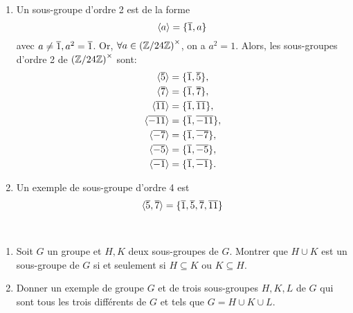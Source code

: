 {\begin{td-sol}[]
\begin{enumerate}
            \item Un sous-groupe d'ordre 2 est de la forme
            \begin{equation*}
                \langle a\rangle = \{\overline{1}, a\}
            \end{equation*}
            avec \(a\ne\overline{1}, a^2 = \overline{1}\). Or, \(\forall a\in{(\mathbb{Z}/24\mathbb{Z})}^\times\),
            on a \(a^2=1\). Alors, les sous-groupes d'ordre 2 de \({(\mathbb{Z}/24\mathbb{Z})}^\times\)
            sont:
            \begin{equation*}
                \begin{aligned}
                    \langle\overline{5}\rangle &= \{\overline{1}, \overline{5}\},\\
                    \langle\overline{7}\rangle &= \{\overline{1}, \overline{7}\},\\
                    \langle\overline{11}\rangle &= \{\overline{1}, \overline{11}\},\\
                    \langle\overline{-11}\rangle &= \{\overline{1}, \overline{-11}\},\\
                    \langle\overline{-7}\rangle &= \{\overline{1}, \overline{-7}\},\\
                    \langle\overline{-5}\rangle &= \{\overline{1}, \overline{-5}\},\\
                    \langle\overline{-1}\rangle &= \{\overline{1}, \overline{-1}\}.
                \end{aligned}
            \end{equation*}

            \item Un exemple de sous-groupe d'ordre 4 est
            \begin{equation*}
                \langle\overline{5}, \overline{7}\rangle = \{\overline{1}, \overline{5}, \overline{7}, \overline{11}\}
            \end{equation*}
        \end{enumerate}
    \end{td-sol}
}{}

\begin{td-exo}\, %
    \begin{enumerate}
        \item Soit \(G\) un groupe et \(H,K\)  deux sous-groupes de \(G\).
        Montrer que \(H\cup K\) est un sous-groupe de \(G\) si et seulement
        si \(H\subseteq K\) ou \(K\subseteq H\).

        \item Donner un exemple de groupe \(G\) et de trois sous-groupes
        \(H,K,L\) de \(G\) qui sont tous les trois différents de \(G\) et
        tels que \(G=H\cup K\cup L\).
    \end{enumerate}
\end{td-exo}


